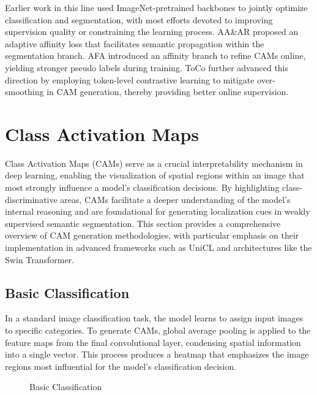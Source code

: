 Earlier work in this line used ImageNet-pretrained backbones \cite{dataset_imagenet} to jointly optimize classification and segmentation, with most efforts devoted to improving supervision quality or constraining the learning process. AA\&AR \cite{wsss_aaar} proposed an adaptive affinity loss that facilitates semantic propagation within the segmentation branch. AFA \cite{wsss_afa_affinity_from_attention} introduced an affinity branch to refine CAMs online, yielding stronger pseudo labels during training. ToCo \cite{wsss_toco_token_contrast} further advanced this direction by employing token-level contrastive learning to mitigate over-smoothing in CAM generation, thereby providing better online supervision.

\section{Class Activation Maps}
\label{sec:class-activation-maps}

Class Activation Maps (CAMs) serve as a crucial interpretability mechanism in deep learning, enabling the visualization of spatial regions within an image that most strongly influence a model's classification decisions. By highlighting class-discriminative areas, CAMs facilitate a deeper understanding of the model's internal reasoning and are foundational for generating localization cues in weakly supervised semantic segmentation. This section provides a comprehensive overview of CAM generation methodologies, with particular emphasis on their implementation in advanced frameworks such as UniCL and architectures like the Swin Transformer.

\subsection{Basic Classification}
\label{subsec:basic_classification}

In a standard image classification task, the model learns to assign input images to specific categories. To generate CAMs, global average pooling is applied to the feature maps from the final convolutional layer, condensing spatial information into a single vector. This process produces a heatmap that emphasizes the image regions most influential for the model's classification decision.

\begin{figure}[htbp]
    \centering
    \caption{Basic Classification}
    \label{fig:basic_classification}
\end{figure}



